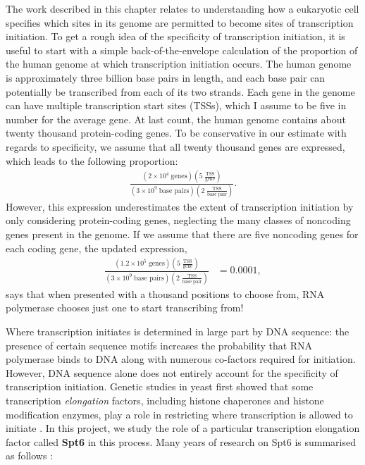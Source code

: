 The work described in this chapter relates to understanding how a eukaryotic cell specifies which sites in its genome are permitted to become sites of transcription initiation.
To get a rough idea of the specificity of transcription initiation, it is useful to start with a simple back-of-the-envelope calculation of the proportion of the human genome at which transcription initiation occurs.
The human genome is approximately three billion base pairs in length, and each base pair can potentially be transcribed from each of its two strands.
Each gene in the genome can have multiple transcription start sites (TSSs), which I assume to be five in number for the average gene.
At last count, the human genome contains about twenty thousand protein-coding genes.
To be conservative in our estimate with regards to specificity, we assume that all twenty thousand genes are expressed, which leads to the following proportion:
\begin{align*}
    \frac{\left(2 \times 10^4 \; \text{genes}\right) \left(5 \; \frac{\text{TSS}}{\text{gene}} \right)}
         {\left(3 \times 10^9 \; \text{base pairs} \right) \left(2 \; \frac{\text{TSS}}{\text{base pair}} \right)}.
\end{align*}
However, this expression underestimates the extent of transcription initiation by only considering protein-coding genes, neglecting the many classes of noncoding genes present in the genome.
If we assume that there are five noncoding genes for each coding gene, the updated expression,
\begin{align*}
    \frac{\left(1.2 \times 10^5 \; \text{genes}\right) \left(5 \; \frac{\text{TSS}}{\text{gene}} \right)}
         {\left(3 \times 10^9 \; \text{base pairs} \right) \left(2 \; \frac{\text{TSS}}{\text{base pair}} \right)}
    &= 0.0001,
\end{align*}
says that when presented with a thousand positions to choose from, RNA polymerase chooses just one to start transcribing from!

Where transcription initiates is determined in large part by DNA sequence: the presence of certain sequence motifs increases the probability that RNA polymerase binds to DNA along with numerous co-factors required for initiation.
However, DNA sequence alone does not entirely account for the specificity of transcription initiation.
Genetic studies in yeast first showed that some transcription \textit{elongation} factors, including histone chaperones and histone modification enzymes, play a role in restricting where transcription is allowed to initiate \citep{kaplan2003, cheung2008, hennig2013}.
In this project, we study the role of a particular transcription elongation factor called \textbf{Spt6} in this process.
Many years of research on Spt6 is summarised as follows \citep{doris2018}:

